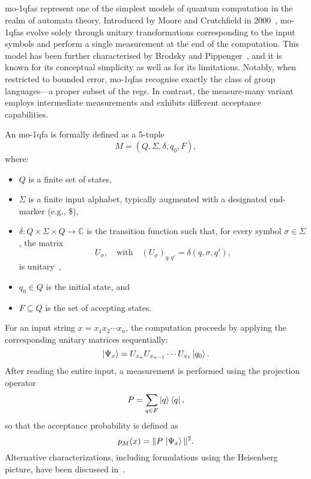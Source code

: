 \subsection{}
\label{sec:moqfa}

\glspl{mo-1qfa} represent one of the simplest models of quantum computation in the realm of automata theory. Introduced by Moore and Crutchfield in 2000~\cite{moore2000quantum}, \glspl{mo-1qfa} evolve solely through unitary transformations corresponding to the input symbols and perform a single measurement at the end of the computation. This model has been further characterised by Brodsky and Pippenger~\cite{brodsky2002characterizations}, and it is known for its conceptual simplicity as well as for its limitations. Notably, when restricted to bounded error, \glspl{mo-1qfa} recognise exactly the class of group languages—a proper subset of the \glspl{reg}. In contrast, the measure-many variant ~\cite{kondacs1997power} employs intermediate measurements and exhibits different acceptance capabilities.

\begin{definition}
An \gls{mo-1qfa} is formally defined as a 5-tuple 
\[
M = (Q,\Sigma,\delta,q_0,F),
\]
where:
\begin{itemize}
    \item $Q$ is a finite set of states,
    \item $\Sigma$ is a finite input alphabet, typically augmented with a designated end-marker (e.g., \$),
    \item $\delta : Q \times \Sigma \times Q \to \mathbb{C}$ is the transition function such that, for every symbol $\sigma\in\Sigma$, the matrix 
    \[
    U_\sigma,\quad \text{with} \quad (U_\sigma)_{q,q'} = \delta(q,\sigma,q'),
    \]
    is unitary~\cite{moore2000quantum},
    \item $q_0 \in Q$ is the initial state, and
    \item $F\subseteq Q$ is the set of accepting states.
\end{itemize}
\end{definition}

For an input string $x=x_1x_2\cdots x_n$, the computation proceeds by applying the corresponding unitary matrices sequentially:
\[
\ket{\Psi_x} = U_{x_n}U_{x_{n-1}}\cdots U_{x_1}\ket{q_0}.
\]
After reading the entire input, a measurement is performed using the projection operator
\[
P=\sum_{q\in F} \ket{q}\bra{q},
\]
so that the acceptance probability is defined as
\[
p_M(x)=\|P\,\ket{\Psi_x}\|^2.
\]
Alternative characterizations, including formulations using the Heisenberg picture, have been discussed in~\cite{qiu2004characterizations,piazza2022mirrors}.

